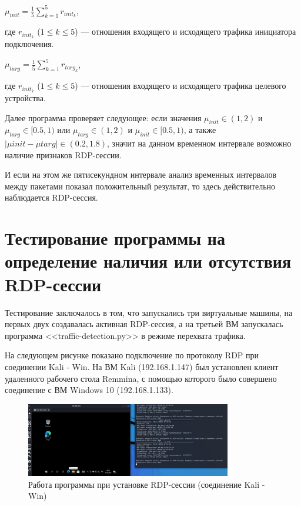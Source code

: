 \documentclass[bachelor, och, coursework]{SCWorks}
\begin{document}
\begin{center}
  $\mu_{init} = \frac{1}{5}\sum_{k = 1}^{5} r_{init_{k}}$,
\end{center}

где $r_{init_{k}}$ ($1 \leq k \leq 5$) --- отношения входящего и исходящего трафика инициатора подключения.


\begin{center}
  $\mu_{targ} = \frac{1}{5}\sum_{k = 1}^{5} r_{targ_{k}}$,
\end{center}

где $r_{init_{k}}$ ($1 \leq k \leq 5$) --- отношения входящего и исходящего трафика целевого устройства.

Далее программа проверяет следующее: если значения $\mu_{init} \in (1, 2) $ и $\mu_{targ} \in [0.5, 1)$ или 
$\mu_{targ} \in (1, 2) $ и $\mu_{init} \in [0.5, 1)$, а также $|\mu{init} - \mu{targ}| \in (0.2, 1.8)$, значит 
на данном временном интервале возможно наличие признаков RDP-сессии. 

И если на этом же пятисекундном интервале анализ временных интервалов между пакетами показал положительный результат, то здесь действительно
наблюдается RDP-сессия.


\section{Тестирование программы на определение наличия или отсутствия RDP-сессии}

Тестирование заключалось в том, что запускались три виртуальные машины, на первых двух создавалась активная RDP-сессия,
а на третьей ВМ запускалась программа <<traffic-detection.py>> в режиме перехвата трафика.

На следующем рисунке показано подключение по протоколу RDP при соединении Kali - Win. На ВМ Kali (192.168.1.147) был установлен клиент удаленного
рабочего стола Remmina, с помощью которого было совершено соединение с ВМ Windows 10 (192.168.1.133).

\begin{figure}[H]
  \centering
  \includegraphics[width=0.8\textwidth]{photo/rdp1.jpg}
  \caption{Работа программы при установке RDP-сессии (соединение Kali - Win) }
  \label{rdp1}
\end{figure}
\end{document}
